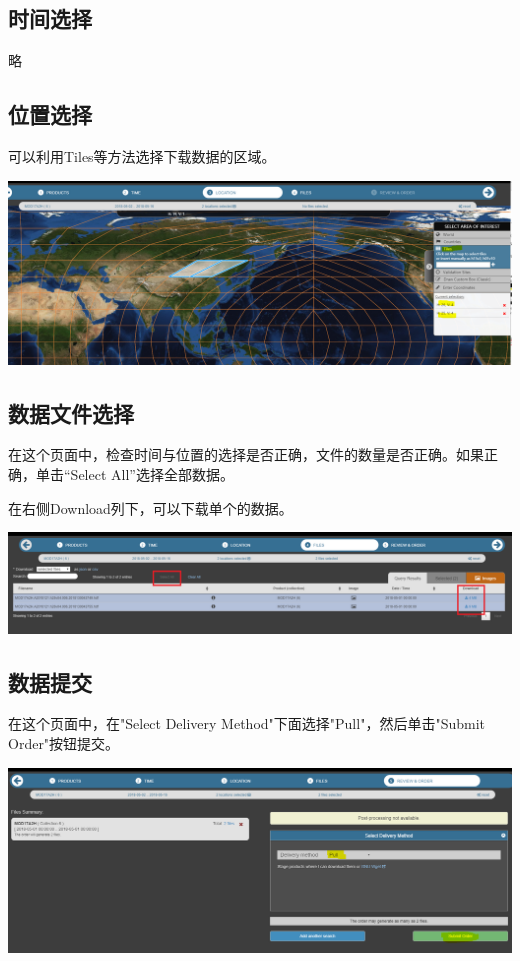 \documentclass{article}
\begin{document}
	\subsection{时间选择}
	
	略
	
	\subsection{位置选择}
	
	可以利用Tiles等方法选择下载数据的区域。
	
	\includegraphics[width=\linewidth]{sec2_2.png}
	
	\subsection{数据文件选择}
	
	在这个页面中，检查时间与位置的选择是否正确，文件的数量是否正确。如果正确，单击“Select All”选择全部数据。
	
	在右侧Download列下，可以下载单个的数据。
	
	\includegraphics[width=\linewidth]{sec2_3.png}
	
	\subsection{数据提交}
	
	在这个页面中，在"Select Delivery Method"下面选择"Pull"，然后单击"Submit Order"按钮提交。
	
	\includegraphics[width=\linewidth]{sec2_4.png}
\end{document}
